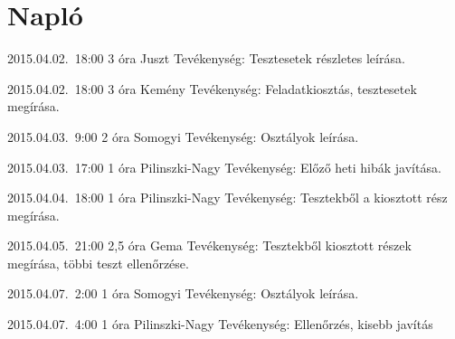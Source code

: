 %
\section{Napló}

\begin{naplo}
	
\bejegyzes
{2015.04.02.~18:00}
{3 óra}
{Juszt}
{Tevékenység: Tesztesetek részletes leírása.}

\bejegyzes
{2015.04.02.~18:00}
{3 óra}
{Kemény}
{Tevékenység: Feladatkiosztás, tesztesetek megírása.}

\bejegyzes
{2015.04.03.~9:00}
{2 óra}
{Somogyi}
{Tevékenység: Osztályok leírása.}

\bejegyzes
{2015.04.03.~17:00}
{1 óra}
{Pilinszki-Nagy}
{Tevékenység: Előző heti hibák javítása.}

\bejegyzes
{2015.04.04.~18:00}
{1 óra}
{Pilinszki-Nagy}
{Tevékenység: Tesztekből a kiosztott rész megírása.}

\bejegyzes
{2015.04.05.~21:00}
{2,5 óra}
{Gema}
{Tevékenység: Tesztekből kiosztott részek megírása, többi teszt ellenőrzése.}

\bejegyzes
{2015.04.07.~2:00}
{1 óra}
{Somogyi}
{Tevékenység: Osztályok leírása.}

\bejegyzes
{2015.04.07.~4:00}
{1 óra}
{Pilinszki-Nagy}
{Tevékenység: Ellenőrzés, kisebb javítás}


\end{naplo}

